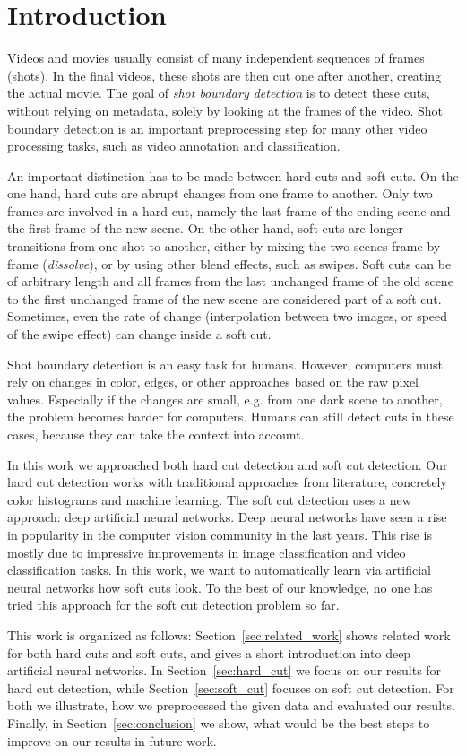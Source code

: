 \section{Introduction}
\label{sec:introduction}

Videos and movies usually consist of many independent sequences of frames (shots).
In the final videos, these shots are then cut one after another, creating the actual movie.
The goal of \emph{shot boundary detection} is to detect these cuts, without relying on metadata, solely by looking at the frames of the video.
Shot boundary detection is an important preprocessing step for many other video processing tasks, such as video annotation and classification.

An important distinction has to be made between hard cuts and soft cuts.
On the one hand, hard cuts are abrupt changes from one frame to another.
Only two frames are involved in a hard cut, namely the last frame of the ending scene and the first frame of the new scene.
On the other hand, soft cuts are longer transitions from one shot to another, either by mixing the two scenes frame by frame (\emph{dissolve}), or by using other blend effects, such as swipes.
Soft cuts can be of arbitrary length and all frames from the last unchanged frame of the old scene to the first unchanged frame of the new scene are considered part of a soft cut.
Sometimes, even the rate of change (interpolation between two images, or speed of the swipe effect) can change inside a soft cut.

Shot boundary detection is an easy task for humans.
However, computers must rely on changes in color, edges, or other approaches based on the raw pixel values.
Especially if the changes are small, e.g. from one dark scene to another, the problem becomes harder for computers.
Humans can still detect cuts in these cases, because they can take the context into account.

In this work we approached both hard cut detection and soft cut detection.
Our hard cut detection works with traditional approaches from literature, concretely color histograms and machine learning.
The soft cut detection uses a new approach: deep artificial neural networks.
Deep neural networks have seen a rise in popularity in the computer vision community in the last years.
This rise is mostly due to impressive improvements in image classification and video classification tasks.
In this work, we want to automatically learn via artificial neural networks how soft cuts look.
To the best of our knowledge, no one has tried this approach for the soft cut detection problem so far.

This work is organized as follows:
Section~\ref{sec:related_work} shows related work for both hard cuts and soft cuts, and gives a short introduction into deep artificial neural networks.
In Section~\ref{sec:hard_cut} we focus on our results for hard cut detection, while Section~\ref{sec:soft_cut} focuses on soft cut detection.
For both we illustrate, how we preprocessed the given data and evaluated our results.
Finally, in Section~\ref{sec:conclusion} we show, what would be the best steps to improve on our results in future work.
